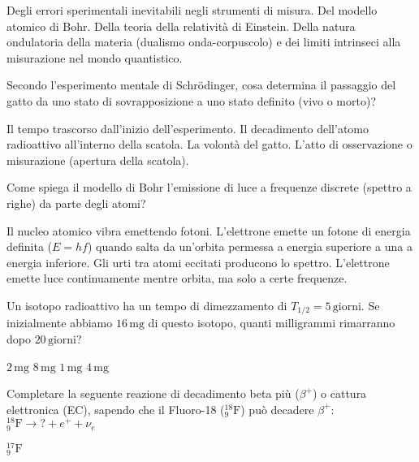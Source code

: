 \documentclass{exam}%
\begin{document}
\begin{questions}
\begin{choices}
\choice Degli errori sperimentali inevitabili negli strumenti di misura.%
\choice Del modello atomico di Bohr.%
\choice Della teoria della relatività di Einstein.%
\choice Della natura ondulatoria della materia (dualismo onda-corpuscolo) e dei limiti intrinseci alla misurazione nel mondo quantistico.%
\end{choices}%
\question Secondo l'esperimento mentale di Schrödinger, cosa determina il passaggio del gatto da uno stato di sovrapposizione a uno stato definito (vivo o morto)?%
\vspace{0.2em}%
\begin{choices}%
\choice Il tempo trascorso dall'inizio dell'esperimento.%
\choice Il decadimento dell'atomo radioattivo all'interno della scatola.%
\choice La volontà del gatto.%
\choice L'atto di osservazione o misurazione (apertura della scatola).%
\end{choices}%
\question Come spiega il modello di Bohr l'emissione di luce a frequenze discrete (spettro a righe) da parte degli atomi?%
\vspace{0.2em}%
\begin{choices}%
\choice Il nucleo atomico vibra emettendo fotoni.%
\choice L'elettrone emette un fotone di energia definita ($E = hf$) quando salta da un'orbita permessa a energia superiore a una a energia inferiore.%
\choice Gli urti tra atomi eccitati producono lo spettro.%
\choice L'elettrone emette luce continuamente mentre orbita, ma solo a certe frequenze.%
\end{choices}%
\question Un isotopo radioattivo ha un tempo di dimezzamento di $T_{1/2} = 5 \, \text{giorni}$. Se inizialmente abbiamo $16 \, \text{mg}$ di questo isotopo, quanti milligrammi rimarranno dopo $20 \, \text{giorni}$?%
\vspace{0.2em}%
\begin{multicols}{4}%
\begin{choices}%
\choice $2 \, \text{mg}$%
\choice $8 \, \text{mg}$%
\choice $1 \, \text{mg}$%
\choice $4 \, \text{mg}$%
\end{choices}%
\end{multicols}%
\question Completare la seguente reazione di decadimento beta più ($\beta^+$) o cattura elettronica (EC), sapendo che il Fluoro-18 ($^{18}_{9}\text{F}$) può decadere $\beta^+$: $^{18}_{9}\text{F} \rightarrow ? + e^+ + \nu_e$%
\vspace{0.2em}%
\begin{multicols}{4}%
\begin{choices}%
\choice $^{17}_{9}\text{F}$%

\end{choices}
\end{multicols}
\end{questions}
\end{document}
